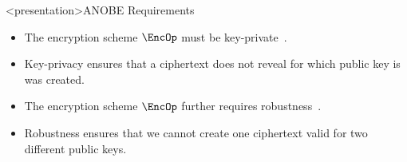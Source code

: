 \begin{frame}
  \begin{figure}
    \begin{algorithmic}[1]

        \pause{}

        \EndFor{}

        \pause{}

      \EndFunction{}
    \end{algorithmic}
  \end{figure}
\end{frame}

\begin{frame}<presentation>{ANOBE Requirements}
  \begin{itemize}
    \item The encryption scheme \(\EncOp\) must be 
      key-private~\cite{KeyPrivacy}.

    \item Key-privacy ensures that a ciphertext does not reveal for which 
      public key is was created.

      \pause{}

    \item The encryption scheme \(\EncOp\) further requires 
      robustness~\cite{RobustEncryption}.

    \item Robustness ensures that we cannot create one ciphertext valid for two 
      different public keys.
  \end{itemize}
\end{frame}

